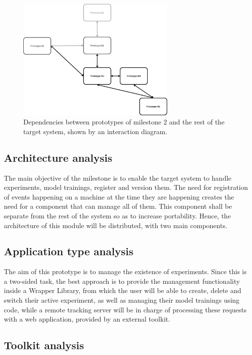 \begin{figure}[H]
    \centering
    \includegraphics[width=0.7\textwidth]{figs/M-dependencies.png}
    \caption{Dependencies between prototypes of milestone 2 and the rest of the target system, shown by an interaction diagram.}
\end{figure}

\subsection{Architecture analysis}

The main objective of the milestone is to enable the target system to handle experiments, model trainings, register and version them. The need for
registration of events happening on a machine at the time they are happening creates the need for a component that can manage all of them. This component
shall be separate from the rest of the system so as to increase portability. Hence, the architecture of this module will be distributed, with two main components.

\subsection{Application type analysis}

The aim of this prototype is to manage the existence of experiments. Since this is a two-sided task, the best approach is to provide the 
management functionality inside a Wrapper Library, from which the user will be able to create, delete and switch their active experiment, as well
as managing their model trainings using code, while a remote tracking server will be in charge of processing these requests with a web 
application, provided by an external toolkit.

\subsection{Toolkit analysis}

